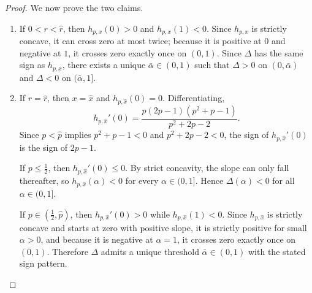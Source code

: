 \documentclass[11pt]{article}
\theoremstyle{plain}
\theoremstyle{definition}
\theoremstyle{plain}
\theoremstyle{plain}
\theoremstyle{plain}
\theoremstyle{plain}
\numberwithin{equation}{section}
\begin{document}
\begin{proof}
    \vspace{2mm}

    \noindent We now prove the two claims.

    \begin{enumerate}
        \item If $0 < r < \hat{r}$, then $h_{p,x}(0) > 0$ and $h_{p,x}(1) < 0$. Since $h_{p,x}$ is strictly concave, it can cross zero at most twice; because it is positive at $0$ and negative at $1$, it crosses zero exactly once on $(0,1)$. Since $\Delta$ has the same sign as $h_{p,x}$, there exists a unique $\bar{\alpha} \in (0,1)$ such that $\Delta > 0$ on $(0,\bar{\alpha})$ and $\Delta < 0$ on $(\bar{\alpha},1]$.

        \item If $r = \hat{r}$, then $x = \hat{x}$ and $h_{p,\hat{x}}(0)=0$. Differentiating,
        \begin{equation*}
            h_{p,\hat{x}}'(0) = \frac{p(2p-1)(p^2+p-1)}{p^2+2p-2}.
        \end{equation*}
        Since $p < \hat{p}$ implies $p^2+p-1 < 0$ and $p^2+2p-2 < 0$, the sign of $h_{p,\hat{x}}'(0)$ is the sign of $2p-1$.

        \vspace{2mm}

        \noindent If $p \leq \frac{1}{2}$, then $h_{p,\hat{x}}'(0) \leq 0$. By strict concavity, the slope can only fall thereafter, so $h_{p,\hat{x}}(\alpha) < 0$ for every $\alpha \in (0,1]$. Hence $\Delta(\alpha) < 0$ for all $\alpha \in (0,1]$.

        \vspace{2mm}

        \noindent If $p \in \left(\frac{1}{2}, \hat{p}\right)$, then $h_{p,\hat{x}}'(0) > 0$ while $h_{p,\hat{x}}(1) < 0$. Since $h_{p,\hat{x}}$ is strictly concave and starts at zero with positive slope, it is strictly positive for small $\alpha > 0$, and because it is negative at $\alpha = 1$, it crosses zero exactly once on $(0,1)$. Therefore $\Delta$ admits a unique threshold $\bar{\alpha} \in (0,1)$ with the stated sign pattern.
    \end{enumerate}
\end{proof}
\vspace{0.4cm}
\end{document}
